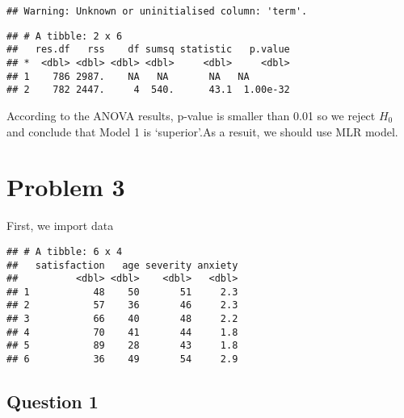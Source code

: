 \documentclass[]{article}
\newenvironment{Shaded}{\begin{snugshade}}{\end{snugshade}}
\newcommand{\KeywordTok}[1]{\textcolor[rgb]{0.13,0.29,0.53}{\textbf{#1}}}
\newcommand{\DataTypeTok}[1]{\textcolor[rgb]{0.13,0.29,0.53}{#1}}
\newcommand{\StringTok}[1]{\textcolor[rgb]{0.31,0.60,0.02}{#1}}
\newcommand{\OperatorTok}[1]{\textcolor[rgb]{0.81,0.36,0.00}{\textbf{#1}}}
\newcommand{\NormalTok}[1]{#1}
\begin{document}
\begin{verbatim}
## Warning: Unknown or uninitialised column: 'term'.
\end{verbatim}

\begin{verbatim}
## # A tibble: 2 x 6
##   res.df   rss    df sumsq statistic   p.value
## *  <dbl> <dbl> <dbl> <dbl>     <dbl>     <dbl>
## 1    786 2987.    NA   NA       NA   NA       
## 2    782 2447.     4  540.      43.1  1.00e-32
\end{verbatim}

According to the ANOVA results, p-value is smaller than 0.01 so we
reject \(H_0\) and conclude that Model 1 is `superior'.As a resuit, we
should use MLR model.

\section{Problem 3}\label{problem-3}

First, we import data

\begin{Shaded}
\end{Shaded}

\begin{verbatim}
## # A tibble: 6 x 4
##   satisfaction   age severity anxiety
##          <dbl> <dbl>    <dbl>   <dbl>
## 1           48    50       51     2.3
## 2           57    36       46     2.3
## 3           66    40       48     2.2
## 4           70    41       44     1.8
## 5           89    28       43     1.8
## 6           36    49       54     2.9
\end{verbatim}

\subsection{Question 1}\label{question-1-2}
\end{document}

